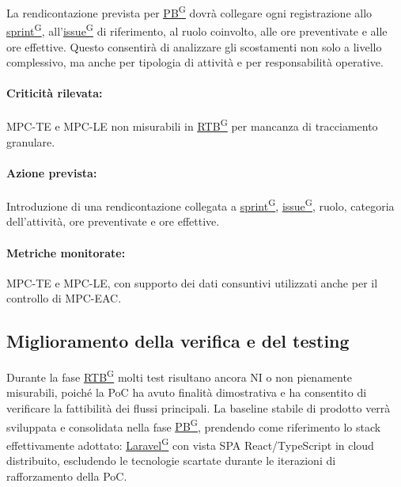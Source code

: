 \documentclass[a4paper,12pt]{article}
\providecommand{\glslink}[2]{\href{https://alittlebyte-19.github.io/Documentazione/glossario.html\#gls-#1}{\underline{#2}\textsuperscript{\scriptsize G}}}
\begin{document}
La rendicontazione prevista per \glslink{pb-product-baseline}{PB} dovrà collegare ogni registrazione allo \glslink{sprint}{sprint}, all'\glslink{issue}{issue} di riferimento, al ruolo coinvolto, alle ore preventivate e alle ore effettive. Questo consentirà di analizzare gli scostamenti non solo a livello complessivo, ma anche per tipologia di attività e per responsabilità operative.

\paragraph*{Criticità rilevata:} MPC-TE e MPC-LE non misurabili in \glslink{rtb-requirements-and-technology-baseline}{RTB} per mancanza di tracciamento granulare.

\paragraph*{Azione prevista:} Introduzione di una rendicontazione collegata a \glslink{sprint}{sprint}, \glslink{issue}{issue}, ruolo, categoria dell'attività, ore preventivate e ore effettive.

\paragraph*{Metriche monitorate:} MPC-TE e MPC-LE, con supporto dei dati consuntivi utilizzati anche per il controllo di MPC-EAC.

\subsection{Miglioramento della verifica e del testing}

Durante la fase \glslink{rtb-requirements-and-technology-baseline}{RTB} molti test risultano ancora NI o non pienamente misurabili, poiché la PoC ha avuto finalità dimostrativa e ha consentito di verificare la fattibilità dei flussi principali. La baseline stabile di prodotto verrà sviluppata e consolidata nella fase \glslink{pb-product-baseline}{PB}, prendendo come riferimento lo stack effettivamente adottato: \glslink{laravel}{Laravel} con vista SPA React/TypeScript in cloud distribuito, escludendo le tecnologie scartate durante le iterazioni di rafforzamento della PoC.
\end{document}
